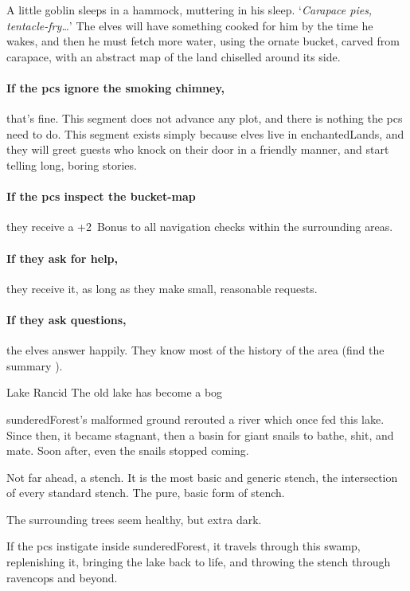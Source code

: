 \begin{multicols}{2}
A little goblin sleeps in a hammock, muttering in his sleep.
`\textit{Carapace pies, tentacle-fry\ldots}'
The elves will have something cooked for him by the time he wakes, and then he must fetch more water, using the ornate bucket, carved from carapace, with an abstract map of the land chiselled around its side.

\elf

\paragraph{If the \glspl{pc} ignore the smoking chimney,}
that's fine.
This \gls{segment} does not advance any plot, and there is nothing the \glspl{pc} need to do.
This \gls{segment} exists simply because elves live in \gls{enchantedLands}, and they will greet guests who knock on their door in a friendly manner, and start telling long, boring stories.

\paragraph{If the \glspl{pc} inspect the bucket-map}
they receive a +2~Bonus to all \gls{navigation} checks within the surrounding \glspl{area}.

\paragraph{If they ask for help,}
they receive it, as long as they make small, reasonable requests.

\paragraph{If they ask questions,}
the elves answer happily.
They know most of the history of the area (find the summary ).

{Lake Rancid}%
{The old lake has become a bog}%

\begin{exampletext}
  \Gls{sunderedForest}'s malformed ground rerouted a river which once fed this lake.
  Since then, it became stagnant, then a basin for giant snails to bathe, shit, and mate.
  Soon after, even the snails stopped coming.
\end{exampletext}

\begin{boxtext}
  Not far ahead, a stench.
  It is the most basic and generic stench, the intersection of every standard stench.
  The pure, basic form of stench.

  The surrounding trees seem healthy, but extra dark.
\end{boxtext}

If the \glspl{pc} instigate  inside \gls{sunderedForest}, it travels through this swamp, replenishing it, bringing the lake back to life, and throwing the stench through \gls{ravencops} and beyond.

\end{multicols}

